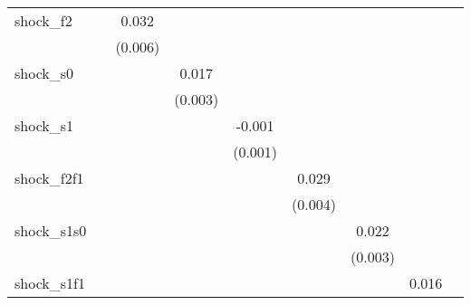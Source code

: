 {\begin{tabular}{l*{8}{c}}
\addlinespace
shock\_f2    &                     &       0.032\sym{***}&                     &                     &                     &                     &                     &                     \\
            &                     &     (0.006)         &                     &                     &                     &                     &                     &                     \\
\addlinespace
shock\_s0    &                     &                     &       0.017\sym{***}&                     &                     &                     &                     &                     \\
            &                     &                     &     (0.003)         &                     &                     &                     &                     &                     \\
\addlinespace
shock\_s1    &                     &                     &                     &      -0.001         &                     &                     &                     &                     \\
            &                     &                     &                     &     (0.001)         &                     &                     &                     &                     \\
\addlinespace
shock\_f2f1  &                     &                     &                     &                     &       0.029\sym{***}&                     &                     &                     \\
            &                     &                     &                     &                     &     (0.004)         &                     &                     &                     \\
\addlinespace
shock\_s1s0  &                     &                     &                     &                     &                     &       0.022\sym{***}&                     &                     \\
            &                     &                     &                     &                     &                     &     (0.003)         &                     &                     \\
\addlinespace
shock\_s1f1  &                     &                     &                     &                     &                     &                     &       0.016\sym{***}&                     \\

\end{tabular}}
